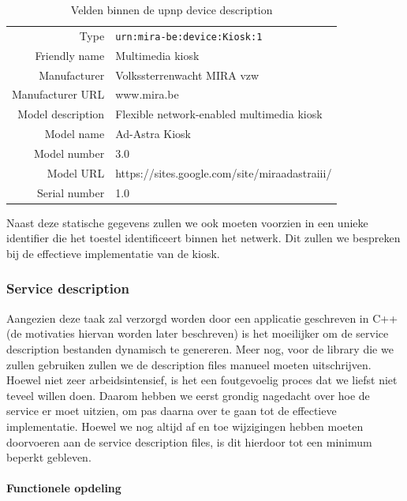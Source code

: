 \begin{table}[h!]
  \begin{center}
    \begin{tabular}{r l}
    \hline
    Type & \texttt{urn:mira-be:device:Kiosk:1} \\
    Friendly name & Multimedia kiosk \\
    Manufacturer & Volkssterrenwacht MIRA vzw \\
    Manufacturer URL & www.mira.be \\
    Model description & Flexible network-enabled multimedia kiosk \\
    Model name & Ad-Astra Kiosk \\
    Model number & 3.0 \\
    Model URL & https://sites.google.com/site/miraadastraiii/ \\
    Serial number & 1.0 \\
    \hline
    \end{tabular}
  \end{center}
  \caption{Velden binnen de \ac{upnp} device description}
  \label{tbl:upnp:device}
\end{table}

Naast deze statische gegevens zullen we ook moeten voorzien in een unieke identifier die het toestel identificeert binnen het netwerk. Dit zullen we bespreken bij de effectieve implementatie van de kiosk.

\subsubsection{Service description}

Aangezien deze taak zal verzorgd worden door een applicatie geschreven in C++ (de motivaties hiervan worden later beschreven) is het moeilijker om de service description bestanden dynamisch te genereren. Meer nog, voor de library die we zullen gebruiken zullen we de description files manueel moeten uitschrijven. Hoewel niet zeer arbeidsintensief, is het een foutgevoelig proces dat we liefst niet teveel willen doen. Daarom hebben we eerst grondig nagedacht over hoe de service er moet uitzien, om pas daarna over te gaan tot de effectieve implementatie. Hoewel we nog altijd af en toe wijzigingen hebben moeten doorvoeren aan de service description files, is dit hierdoor tot een minimum beperkt gebleven.

\paragraph{Functionele opdeling}

